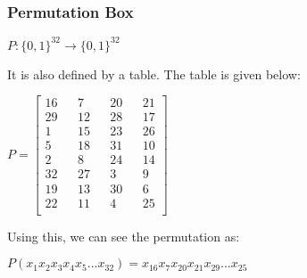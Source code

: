 \documentclass[11pt]{article}
\begin{document}
\subsubsection*{Permutation Box}
\begin{center}
    $P: \{0, 1\}^{32} \rightarrow \{0, 1\}^{32}$\\
\end{center}
It is also defined by a table. The table is given below:
\begin{center}
    $ P = 
    \begin{bmatrix}
        16 && 7 && 20 && 21\\
        29 && 12 && 28 && 17\\
        1 && 15 && 23 && 26\\
        5 && 18 && 31 && 10\\
        2 && 8 && 24 && 14\\
        32 && 27 && 3 && 9\\
        19 && 13 && 30 && 6\\
        22 && 11 && 4 && 25\\
    \end{bmatrix}$
\end{center}
Using this, we can see the permutation as:
\begin{center}
    $P(x_1x_2x_3x_4x_5...x_{32}) = x_{16}x_7x_{20}x_{21}x_{29}...x_{25}$
\end{center}
\end{document}

